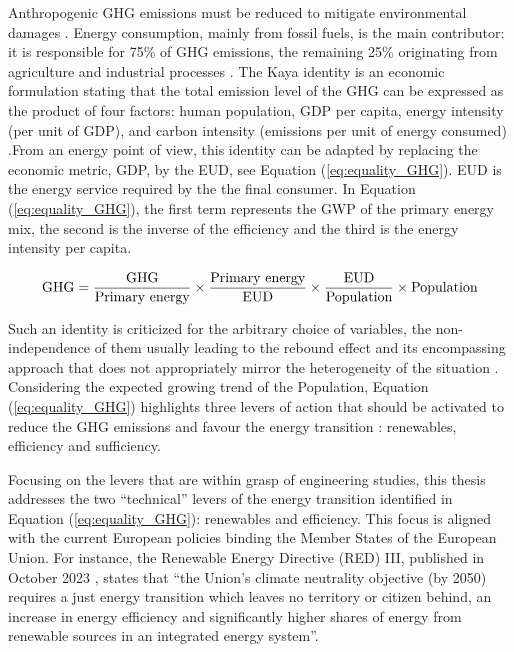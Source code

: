 Anthropogenic \gls{GHG} emissions must be reduced to mitigate environmental damages \cite{IPCC_CO2_budget}. Energy consumption, mainly from fossil fuels, is the main contributor: it is responsible for 75\% of \gls{GHG} emissions, the remaining 25\% originating from agriculture and industrial processes \cite{ourworldindata_CO2_world}. The Kaya identity is an economic formulation stating that the total emission level of the \gls{GHG} can be expressed as the product of four factors: human population, \gls{GDP} per capita, energy intensity (per unit of GDP), and carbon intensity (emissions per unit of energy consumed) \cite{kaya1997environment}.From an energy point of view, this identity can be adapted by replacing the economic metric, \gls{GDP}, by the \gls{EUD}, see Equation (\ref{eq:equality_GHG}). \gls{EUD} is the energy service required by the the final consumer. In Equation (\ref{eq:equality_GHG}), the first term represents the \gls{GWP} of the primary energy mix, the second is the inverse of the efficiency and the third is the energy intensity per capita.

\begin{equation}
\label{eq:equality_GHG}
\mathrm{GHG} =  \frac{\mathrm{GHG}}{\text{Primary energy}} \times \frac{\text{Primary energy}}{\mathrm{EUD}}\times \frac{\mathrm{EUD}}{\text{Population}} \times \text{Population}\\
 \end{equation}

Such an identity is criticized for the arbitrary choice of variables, the non-independence of them usually leading to the rebound effect and its encompassing approach that does not appropriately mirror the heterogeneity of the situation \cite{IPCC2000}. Considering the expected growing trend of the Population, Equation (\ref{eq:equality_GHG}) highlights three levers of action that should be activated to reduce the \gls{GHG} emissions and favour the energy transition \cite{dodson2020population,scovronick2017impact}: renewables, efficiency and sufficiency. 

Focusing on the levers that are within grasp of engineering studies, this thesis addresses the two ``technical'' levers of the energy transition identified in Equation (\ref{eq:equality_GHG}): renewables and efficiency. This focus is aligned with the current European policies binding the Member States of the European Union. For instance, the Renewable Energy Directive (RED) III, published in October 2023 \cite{REDIII}, states that ``the Union’s climate neutrality objective (by 2050) requires a just energy transition which leaves no territory or citizen behind, an increase in energy efficiency and significantly higher shares of energy from renewable sources in an integrated energy system''.%

